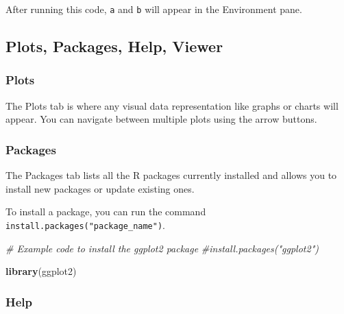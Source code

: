 \documentclass[
]{book}
\newenvironment{Shaded}{\begin{snugshade}}{\end{snugshade}}
\newcommand{\CommentTok}[1]{\textcolor[rgb]{0.56,0.35,0.01}{\textit{#1}}}
\newcommand{\FunctionTok}[1]{\textcolor[rgb]{0.13,0.29,0.53}{\textbf{#1}}}
\newcommand{\NormalTok}[1]{#1}
\begin{document}
After running this code, \texttt{a} and \texttt{b} will appear in the Environment pane.

\hypertarget{plots-packages-help-viewer}{%
\subsection*{Plots, Packages, Help, Viewer}\label{plots-packages-help-viewer}}

\hypertarget{plots}{%
\subsubsection*{Plots}\label{plots}}

The Plots tab is where any visual data representation like graphs or charts will appear. You can navigate between multiple plots using the arrow buttons.

\hypertarget{packages}{%
\subsubsection*{Packages}\label{packages}}

The Packages tab lists all the R packages currently installed and allows you to install new packages or update existing ones.

To install a package, you can run the command \texttt{install.packages("package\_name")}.

\begin{Shaded}
\begin{Highlighting}[]
\CommentTok{\# Example code to install the \textquotesingle{}ggplot2\textquotesingle{} package }
\CommentTok{\#install.packages("ggplot2")}
\end{Highlighting}
\end{Shaded}

\begin{Shaded}
\begin{Highlighting}[]
\FunctionTok{library}\NormalTok{(ggplot2)}
\end{Highlighting}
\end{Shaded}

\hypertarget{help}{%
\subsubsection*{Help}\label{help}}
\end{document}
